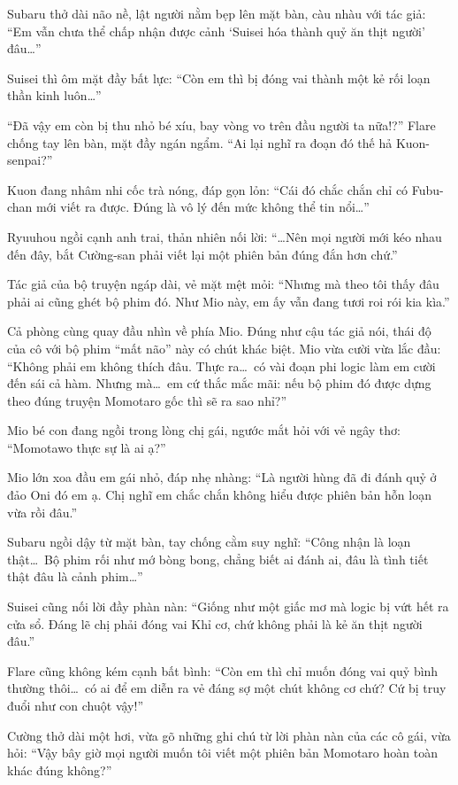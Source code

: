 \documentclass[../main.tex]{subfiles}
\begin{document}
Subaru thở dài não nề, lật người nằm bẹp lên mặt bàn, càu nhàu với tác giả: ``Em vẫn chưa thể chấp nhận được cảnh `Suisei hóa thành quỷ ăn thịt người' đâu\dots''

Suisei thì ôm mặt đầy bất lực: ``Còn em thì bị đóng vai thành một kẻ rối loạn thần kinh luôn\dots''

``Đã vậy em còn bị thu nhỏ bé xíu, bay vòng vo trên đầu người ta nữa!?'' Flare chống tay lên bàn, mặt đầy ngán ngẩm. ``Ai lại nghĩ ra đoạn đó thế hả Kuon-senpai?''

Kuon đang nhâm nhi cốc trà nóng, đáp gọn lỏn: ``Cái đó chắc chắn chỉ có Fubu-chan mới viết ra được. Đúng là vô lý đến mức không thể tin nổi\dots''

Ryuuhou ngồi cạnh anh trai, thản nhiên nối lời: ``\dots Nên mọi người mới kéo nhau đến đây, bắt Cường-san phải viết lại một phiên bản đúng đắn hơn chứ.''

Tác giả của bộ truyện ngáp dài, vẻ mặt mệt mỏi: ``Nhưng mà theo tôi thấy đâu phải ai cũng ghét bộ phim đó. Như Mio này, em ấy vẫn đang tươi roi rói kia kìa.''

Cả phòng cùng quay đầu nhìn về phía Mio. Đúng như cậu tác giả nói, thái độ của cô với bộ phim ``mất não'' này có chút khác biệt. Mio vừa cười vừa lắc đầu: ``Không phải em không thích đâu. Thực ra\dots\ có vài đoạn phi logic làm em cười đến sái cả hàm. Nhưng mà\dots\ em cứ thắc mắc mãi: nếu bộ phim đó được dựng theo đúng truyện Momotaro gốc thì sẽ ra sao nhỉ?''

Mio bé con đang ngồi trong lòng chị gái, ngước mắt hỏi với vẻ ngây thơ: ``Momotawo thực sự là ai ạ?''

Mio lớn xoa đầu em gái nhỏ, đáp nhẹ nhàng: ``Là người hùng đã đi đánh quỷ ở đảo Oni đó em ạ. Chị nghĩ em chắc chắn không hiểu được phiên bản hỗn loạn vừa rồi đâu.''

Subaru ngồi dậy từ mặt bàn, tay chống cằm suy nghĩ: ``Công nhận là loạn thật\dots\ Bộ phim rối như mớ bòng bong, chẳng biết ai đánh ai, đâu là tình tiết thật đâu là cảnh phim\dots''

Suisei cũng nối lời đầy phàn nàn: ``Giống như một giấc mơ mà logic bị vứt hết ra cửa sổ. Đáng lẽ chị phải đóng vai Khỉ cơ, chứ không phải là kẻ ăn thịt người đâu.''

Flare cũng không kém cạnh bất bình: ``Còn em thì chỉ muốn đóng vai quỷ bình thường thôi\dots\ có ai để em diễn ra vẻ đáng sợ một chút không cơ chứ? Cứ bị truy đuổi như con chuột vậy!''

Cường thở dài một hơi, vừa gõ những ghi chú từ lời phàn nàn của các cô gái, vừa hỏi: ``Vậy bây giờ mọi người muốn tôi viết một phiên bản Momotaro hoàn toàn khác đúng không?''
\end{document}
